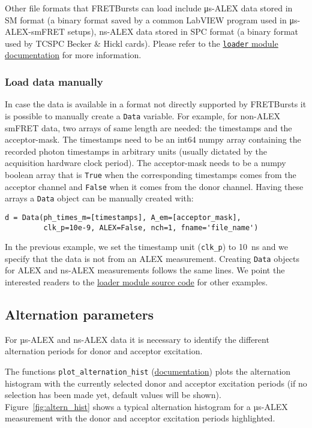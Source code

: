 Other file formats that FRETBursts can load include μs-ALEX data stored in SM format
(a binary format saved by a common LabVIEW program used in μs-ALEX-smFRET setups), 
ns-ALEX data stored in SPC format (a binary format used by TCSPC Becker \& Hickl cards).
Please refer to the 
\href{http://fretbursts.readthedocs.org/en/latest/loader.html}{\texttt{loader} module documentation} 
for more information.

\subsubsection{Load data manually}

In case the data is available in a format not directly supported by 
FRETBursts it is possible to manually create a \verb|Data| variable. 
For example, for non-ALEX smFRET data, two arrays of same length are 
needed: the timestamps and the acceptor-mask. The timestamps need to be 
an int64 numpy array containing the recorded photon timestamps in arbitrary 
units (usually dictated by the acquisition hardware clock period). 
The acceptor-mask needs to be a numpy boolean array that is \verb|True| 
when the corresponding timestamps comes from the acceptor channel and 
\verb|False| when it comes from the donor channel. Having these arrays a 
\verb|Data| object can be manually created with:

\begin{verbatim}
d = Data(ph_times_m=[timestamps], A_em=[acceptor_mask], 
         clk_p=10e-9, ALEX=False, nch=1, fname='file_name')
\end{verbatim}

In the previous example, we set the timestamp unit (\verb|clk_p|) to 10~ns 
and we specify that the data is not from an ALEX measurement. Creating 
\verb|Data| objects for ALEX and ns-ALEX measurements follows the same lines. 
We point the interested readers to the 
\href{https://github.com/tritemio/FRETBursts/blob/master/fretbursts/loader.py}{loader module source code} 
for other examples. 

\subsection{Alternation parameters}
\label{sec:alternation}

For µs-ALEX and ns-ALEX data it is necessary to identify the different 
alternation periods for donor and acceptor excitation.

The functions 
\verb|plot_alternation_hist| (\href{http://fretbursts.readthedocs.org/en/latest/plots.html#fretbursts.burst\_plot.plot\_alternation\_hist}{documentation})
plots the alternation histogram 
with the currently selected donor and acceptor excitation periods
(if no selection has been made yet, default values will be shown).
Figure~\ref{fig:altern_hist} shows a typical alternation histogram for
a µs-ALEX measurement with the donor and acceptor excitation periods highlighted.

